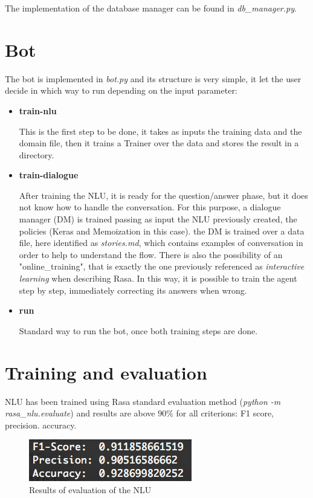 \documentclass[11pt,a4paper]{article}
\begin{document}
	The implementation of the database manager can be found in \textit{db\_manager.py}.

\section{Bot}

The bot is implemented in \textit{bot.py} and its structure is very simple, it let the user decide in which way to run depending on the input parameter:\\

	\begin{itemize}
		\item {\bfseries train-nlu}
		
			This is the first step to be done, it takes as inputs the training data and the domain file, then it trains a Trainer over the data and stores the result in a directory.
		\item {\bfseries train-dialogue}
		
			After training the NLU, it is ready for the question/answer phase, but it does not know how to handle the conversation. For this purpose, a dialogue manager (DM) is trained passing as input the NLU previously created, the policies (Keras and Memoization in this case). the DM is trained over a data file, here identified as \textit{stories.md}, which contains examples of conversation in order to help to understand the flow.
			There is also the possibility of an "online\_training", that is exactly the one previously referenced as \textit{interactive learning} when describing Rasa. In this way, it is possible to train the agent step by step, immediately correcting its answers when wrong.
		\item {\bfseries run}
	
			Standard way to run the bot, once both training steps are done.
	\end{itemize}

\section{Training and evaluation}

NLU has been trained using Rasa standard evaluation method (\textit{python -m rasa\_nlu.evaluate}) and results are above $90\%$ for all criterions: F1 score, precision. accuracy.

\begin{figure}[h]
	\center\includegraphics[scale=1.4]{images/evaluation}
	\center\caption{Results of evaluation of the NLU}
\end{figure}
\end{document}
